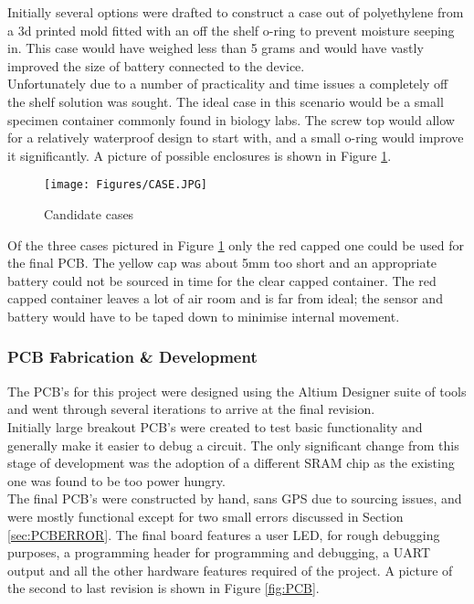 \documentclass[12pt,openany,a4paper]{book}
\begin{document}
	Initially several options were drafted to construct a case out of polyethylene from a 3d printed mold fitted with an off the shelf o-ring to prevent moisture seeping in. This case would have weighed less than 5 grams and would have vastly improved the size of battery connected to the device. \\
	
	Unfortunately due to a number of practicality and time issues a completely off the shelf solution was sought. The ideal case in this scenario would be a small specimen container commonly found in biology labs. The screw top would allow for a relatively waterproof design to start with, and a small o-ring would improve it significantly. A picture of possible enclosures is shown in Figure \ref{fig:CASE}.
	
	\begin{figure}[H]
		\centering
		\texttt{[image: Figures/CASE.JPG]}
		\caption{Candidate cases}
		\label{fig:CASE}
	\end{figure}			

	Of the three cases pictured in Figure \ref{fig:CASE} only the red capped one could be used for the final PCB. The yellow cap was about 5mm too short and an appropriate battery could not be sourced in time for the clear capped container. The red capped container leaves a lot of air room and is far from ideal; the sensor and battery would have to be taped down to minimise internal movement.\\
	
	\subsubsection{PCB Fabrication \& Development}
	The PCB's for this project were designed using the Altium Designer suite of tools and went through several iterations to arrive at the final revision. \\
	
	Initially large breakout PCB's were created to test basic functionality and generally make it easier to debug a circuit. The only significant change from this stage of development was the adoption of a different SRAM chip as the existing one was found to be too power hungry. \\
	
	
	The final PCB's were constructed by hand, sans GPS due to sourcing issues, and were mostly functional except for two small errors discussed in Section \ref{sec:PCBERROR}. The final board features a user LED, for rough debugging purposes, a programming header for programming and debugging, a UART output and all the other hardware features required of the project. A picture of the second to last revision is shown in Figure \ref{fig:PCB}.
	
\end{document}
